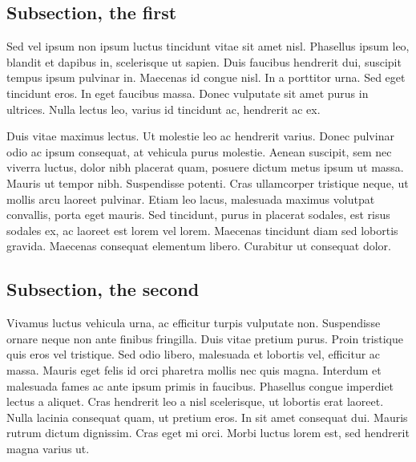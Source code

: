 \subsection{Subsection, the first}

Sed vel ipsum non ipsum luctus tincidunt vitae sit amet nisl. Phasellus ipsum leo, blandit et dapibus in, scelerisque ut
sapien. Duis faucibus hendrerit dui, suscipit tempus ipsum pulvinar in. Maecenas id congue nisl. In a porttitor urna.
Sed eget tincidunt eros. In eget faucibus massa. Donec vulputate sit amet purus in ultrices. Nulla lectus leo, varius id
tincidunt ac, hendrerit ac ex.

Duis vitae maximus lectus. Ut molestie leo ac hendrerit varius. Donec pulvinar odio ac ipsum consequat, at vehicula
purus molestie. Aenean suscipit, sem nec viverra luctus, dolor nibh placerat quam, posuere dictum metus ipsum ut massa.
Mauris ut tempor nibh. Suspendisse potenti. Cras ullamcorper tristique neque, ut mollis arcu laoreet pulvinar. Etiam leo
lacus, malesuada maximus volutpat convallis, porta eget mauris. Sed tincidunt, purus in placerat sodales, est risus
sodales ex, ac laoreet est lorem vel lorem. Maecenas tincidunt diam sed lobortis gravida. Maecenas consequat elementum
libero. Curabitur ut consequat dolor.

\subsection{Subsection, the second}

Vivamus luctus vehicula urna, ac efficitur turpis vulputate non. Suspendisse ornare neque non ante finibus fringilla.
Duis vitae pretium purus. Proin tristique quis eros vel tristique. Sed odio libero, malesuada et lobortis vel, efficitur
ac massa. Mauris eget felis id orci pharetra mollis nec quis magna. Interdum et malesuada fames ac ante ipsum primis in
faucibus. Phasellus congue imperdiet lectus a aliquet. Cras hendrerit leo a nisl scelerisque, ut lobortis erat laoreet.
Nulla lacinia consequat quam, ut pretium eros. In sit amet consequat dui. Mauris rutrum dictum dignissim. Cras eget mi
orci. Morbi luctus lorem est, sed hendrerit magna varius ut.

